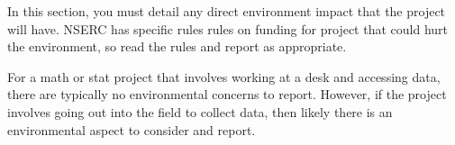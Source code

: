 \documentclass[12pt]{article}
\begin{document}
\setcounter{page}{11}

In this section, you must detail any direct environment impact that the project will have. NSERC has specific rules rules on funding for project that could hurt the environment, so read the rules and report as appropriate. 

For a math or stat project that involves working at a desk and accessing data, there are typically no environmental concerns to report. However, if the project involves going out into the field to collect data, then likely there is an environmental aspect to consider and report.

 
\end{document}
